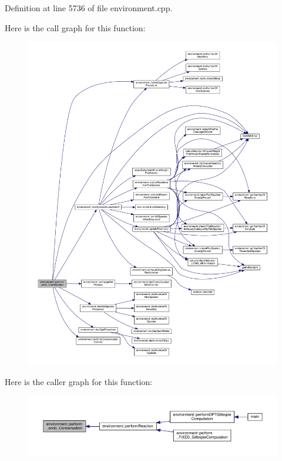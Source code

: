 Definition at line 5736 of file environment.\-cpp.



Here is the call graph for this function\-:\nopagebreak
\begin{figure}[H]
\begin{center}
\leavevmode
\includegraphics[width=350pt]{a00014_aa7a2cc95d8ba242c805a8fda063b23a7_cgraph}
\end{center}
\end{figure}




Here is the caller graph for this function\-:\nopagebreak
\begin{figure}[H]
\begin{center}
\leavevmode
\includegraphics[width=350pt]{a00014_aa7a2cc95d8ba242c805a8fda063b23a7_icgraph}
\end{center}
\end{figure}


